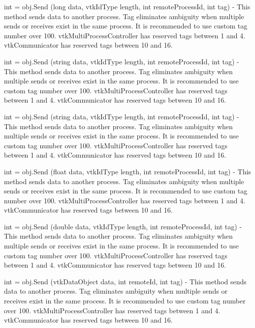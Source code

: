 \begin{DoxyItemize}
\item {\ttfamily int = obj.\-Send (long data, vtk\-Id\-Type length, int remote\-Process\-Id, int tag)} -\/ This method sends data to another process. Tag eliminates ambiguity when multiple sends or receives exist in the same process. It is recommended to use custom tag number over 100. vtk\-Multi\-Process\-Controller has reserved tags between 1 and 4. vtk\-Communicator has reserved tags between 10 and 16.  
\item {\ttfamily int = obj.\-Send (string data, vtk\-Id\-Type length, int remote\-Process\-Id, int tag)} -\/ This method sends data to another process. Tag eliminates ambiguity when multiple sends or receives exist in the same process. It is recommended to use custom tag number over 100. vtk\-Multi\-Process\-Controller has reserved tags between 1 and 4. vtk\-Communicator has reserved tags between 10 and 16.  
\item {\ttfamily int = obj.\-Send (string data, vtk\-Id\-Type length, int remote\-Process\-Id, int tag)} -\/ This method sends data to another process. Tag eliminates ambiguity when multiple sends or receives exist in the same process. It is recommended to use custom tag number over 100. vtk\-Multi\-Process\-Controller has reserved tags between 1 and 4. vtk\-Communicator has reserved tags between 10 and 16.  
\item {\ttfamily int = obj.\-Send (float data, vtk\-Id\-Type length, int remote\-Process\-Id, int tag)} -\/ This method sends data to another process. Tag eliminates ambiguity when multiple sends or receives exist in the same process. It is recommended to use custom tag number over 100. vtk\-Multi\-Process\-Controller has reserved tags between 1 and 4. vtk\-Communicator has reserved tags between 10 and 16.  
\item {\ttfamily int = obj.\-Send (double data, vtk\-Id\-Type length, int remote\-Process\-Id, int tag)} -\/ This method sends data to another process. Tag eliminates ambiguity when multiple sends or receives exist in the same process. It is recommended to use custom tag number over 100. vtk\-Multi\-Process\-Controller has reserved tags between 1 and 4. vtk\-Communicator has reserved tags between 10 and 16.  
\item {\ttfamily int = obj.\-Send (vtk\-Data\-Object data, int remote\-Id, int tag)} -\/ This method sends data to another process. Tag eliminates ambiguity when multiple sends or receives exist in the same process. It is recommended to use custom tag number over 100. vtk\-Multi\-Process\-Controller has reserved tags between 1 and 4. vtk\-Communicator has reserved tags between 10 and 16.  

\end{DoxyItemize}
